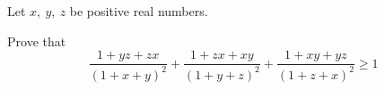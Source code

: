Let $ x,\ y,\ z$ be positive real numbers.

Prove that\[ \frac {1 + yz + zx}{(1 + x + y)^2} + \frac {1 + zx + xy}{(1 + y + z)^2} + \frac {1 + xy + yz}{(1 + z + x)^2}\geq 1\]